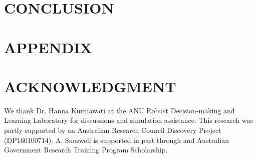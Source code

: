 \documentclass[letterpaper, 10 pt, conference]{ieeeconf}
\begin{document}
\lipsum[1]

\section{CONCLUSION}

\lipsum[1]








\section*{APPENDIX}

\lipsum[1]

\section*{ACKNOWLEDGMENT}

We thank Dr. Hanna Kurniawati at the ANU Robust Decision-making and Learning Laboratory for discussions and simulation assistance.  This research was partly supported by an Australian Research Council Discovery Project (DP160100714).  A. Snoswell is supported in part through and Australian Government Research Training Program Scholarship. 





\end{document}
